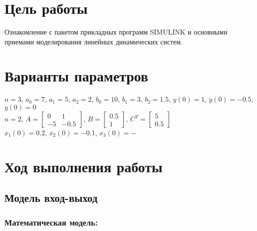 







\section{Цель работы}
Ознакомление с пакетом прикладных программ SIMULINK и основными приемами моделирования линейных динамических систем.


\section{Варианты параметров}

$n = 3$, $a_0 = 7$, $a_1 = 5$, $a_2 = 2$, $b_0 = 10$, $b_1 = 3$, $b_2 = 1.5$, $y(0) = 1$, $\dot{y}(0) = -0.5$, $\ddot{y}(0) = 0$\\

$n = 2$,  $A = \begin{bmatrix}
				0 & 1\\
				-5 & -0.5
				\end{bmatrix}$, $B = \begin{bmatrix}
									0.5\\
									1
									\end{bmatrix}$, $C^T = \begin{bmatrix}
															5\\
															0.5
															\end{bmatrix}$\\
															
$x_1(0) = 0.2$, $x_2(0) = -0.1$, $x_3(0) = -$


\section{Ход выполнения работы}

\subsection{Модель вход-выход}

\subsubsection{Математическая модель:}

